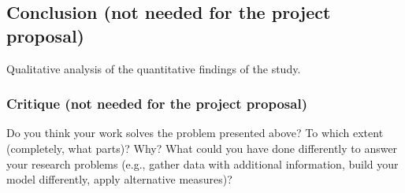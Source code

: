 \documentclass[12pt, a4paper]{article}
\begin{document}

\subsection{Conclusion (not needed for the project proposal)}
Qualitative analysis of the quantitative findings of the study.

\subsubsection{Critique (not needed for the project proposal)}
\label{critique-not-needed-for-the-project-proposal}

Do you think your work solves the problem presented above? To which
extent (completely, what parts)? Why? What could you have done
differently to answer your research problems (e.g., gather data with
additional information, build your model differently, apply alternative
measures)?
\end{document}
